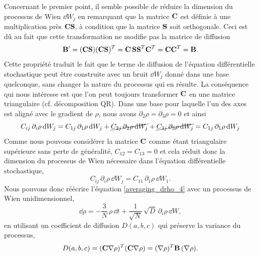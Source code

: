 \documentclass[openany,a4paper,12pt]{article}
\begin{document}
\par Concernant le premier point, il semble possible de réduire la dimension du processus de Wien $\dd W_j$ en remarquant que la matrice $\bold C$ est définie à une multiplication près $\bold C \bold S$, à condition que la matrice $\bold S$ soit orthogonale. Ceci est dû au fait que cette transformation ne modifie pas la matrice de diffusion 
%
\begin{equation}\label{invariance_B}
	\bold B' = (\bold C \bold S) (\bold C \bold S)^T = \bold C \, \bold S \bold S^T \bold C^T = \bold C \bold C^T = \bold B.
\end{equation}
%
Cette propriété traduit le fait que le terme de diffusion de l'équation différentielle stochastique peut être construite avec un bruit $\dd W_j$ donné dans une base quelconque, sans changer la nature du processus qui en résulte. %
La conséquence qui nous intéresse est que l'on peut toujours transformer $\bold C$ en une matrice triangulaire (cf. décomposition QR). Dans une base pour laquelle l'un des axes est aligné avec le gradient de $\rho$, nous avons $\partial_2\rho = \partial_3\rho = 0$ et ainsi
%
\begin{equation}\label{reduction_dW_1D_1}
	C_{ij} \, \partial_i\rho \, \dd W_j = 
	C_{1j} \, \partial_1\rho \, \dd W_j + 
	\cancel{ C_{2j} \, \partial_2\rho \, \dd W_j } + 
	\cancel{ C_{3j} \, \partial_3\rho \, \dd W_j }
	= C_{1j} \, \partial_1\rho \, \dd W_j
\end{equation}
%
Comme nous pouvons considérer la matrice $\bold C$ comme étant triangulaire supérieure sans perte de généralité, $C_{12} = C_{13} = 0$ et cela réduit donc la dimension du processus de Wien nécessaire dans l'équation différentielle stochastique,
%
\begin{equation}\label{reduction_dW_1D_2}
	C_{ij} \, \partial_i\rho \, \dd W_j = C_{11} \, \partial_1\rho \, \dd W_1.
\end{equation}
%
Nous pouvons donc réécrire l'équation \ref{averaging_drho_4} avec un processus de Wien unidimensionnel,
%
\begin{equation}\label{averaging_drho_5}
\dd \rho = -\frac 3N \, \rho \, \dd t + \frac{1}{\sqrt{N}}\, \sqrt{D} \, \partial_i\rho \, \dd W,
\end{equation}
%
en utilisant un coefficient de diffusion $D(a,b,c)$ qui préserve la variance du processus,
%
\begin{equation}\label{expr_D_abc_variance}
	D(a,b,c) = (\bold C \bold \nabla\rho)^T(\bold C \bold \nabla\rho) = (\bold \nabla\rho)^T \bold B \, (\bold \nabla\rho).
\end{equation}
%
\end{document}
